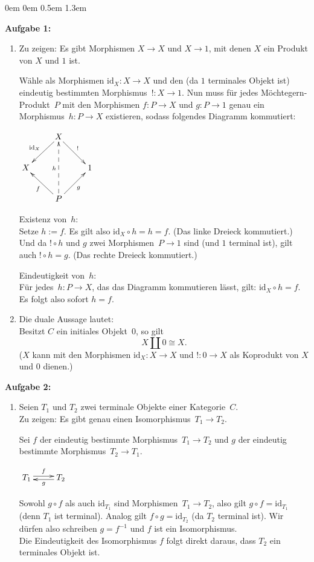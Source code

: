 \documentclass[a4paper,ngerman]{scrartcl}
\theoremstyle{definition}
\theoremstyle{plain}
\theoremstyle{remark}
\newcommand{\id}{\mathrm{id}}
\begin{document}
\begin{list}{}{0em \leftmargin0em \itemindent0.5em \itemsep 1.3em}
\item[\textbf{Aufgabe 1:}]\mbox{}
\begin{enumerate}
\item 
Zu zeigen: Es gibt Morphismen $X\to X$ und $X\to 1$, mit denen $X$ ein Produkt von $X$ und $1$ ist.

Wähle als Morphismen $\id_X:X\to X$ und den (da $1$ terminales Objekt ist) eindeutig bestimmten Morphismus~$!:X\to 1$. Nun muss für jedes Möchtegern-Produkt~$P$ mit den Morphismen $f:P\to X$ und $g:P\to 1
$ genau ein Morphismus~$h:P\to X$ existieren, sodass folgendes Diagramm kommutiert:
\begin{center}
$\xymatrix{
 & X \ar[dl]_{\id_X} \ar[dr]^{\mathrm{!}} &\\
X & & 1\\
 & P \ar[ul]^f \ar[ur]_g \ar@{-->}[uu]^h &
}$
\end{center}

Existenz von~$h$:\\
Setze $h:=f$. Es gilt also $\id_X\circ h=h=f$. (Das linke Dreieck kommutiert.) Und da $!\circ h$ und $
g$ zwei Morphismen~$P\to 1$ sind (und $1$ terminal ist), gilt auch $!\circ h=g$. (Das rechte Dreieck kommutiert.)

Eindeutigkeit von~$h$:\\
Für jedes~$h:P\to X$, das das Diagramm kommutieren lässt, gilt: $\id_X\circ h=f$. Es folgt also sofort
 $h=f$.


\item
Die duale Aussage lautet:\\
Besitzt $C$ ein initiales Objekt~$0$, so gilt
\[X \amalg 0 \cong X.\]
($X$ kann mit den Morphismen $\id_X:X\to X$ und $!:0\to X$ als Koprodukt von $X$ und $0$ dienen.)
\end{enumerate}

\item[\textbf{Aufgabe 2:}]\mbox{}
\begin{enumerate}
\item
Seien $T_1$ und $T_2$ zwei terminale Objekte einer Kategorie~$C$.\\
Zu zeigen: Es gibt genau einen Isomorphismus~$T_1\to T_2$.

Sei $f$ der eindeutig bestimmte Morphismus~$T_1\to T_2$ und $g$ der eindeutig bestimmte Morphismus~$T_2\to T_1$.
\begin{center}
$\xymatrix{
T_1\ar@<0.2em>[r]^f & T_2\ar@<0.2em>[l]^g
}$
\end{center}
Sowohl $g\circ f$ als auch $\id_{T_1}$ sind Morphismen~$T_1\to T_2$, also gilt $g\circ f=\id_{T_1}$ (denn $T_1$ ist terminal). Analog gilt $f\circ g=\id_{T_2}$ (da $T_2$ terminal ist). Wir dürfen also schreiben $g=f^{-1}$ und $f$ ist ein Isomorphismus.\\
Die Eindeutigkeit des Isomorphismus $f$ folgt direkt daraus, dass $T_2$ ein terminales Objekt ist.


\end{enumerate}
\end{list}
\end{document}
